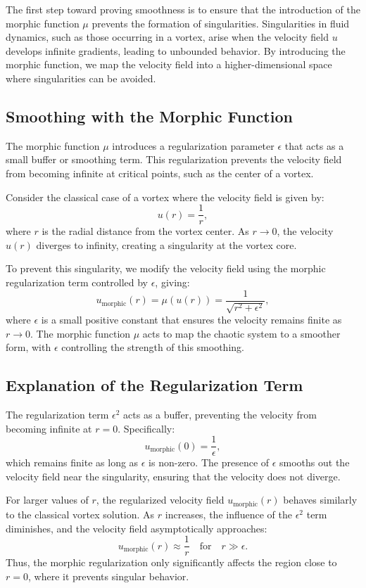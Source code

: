 \documentclass{article}
\begin{document}
The first step toward proving smoothness is to ensure that the introduction of the morphic function \( \mu \) prevents the formation of singularities. Singularities in fluid dynamics, such as those occurring in a vortex, arise when the velocity field \( u \) develops infinite gradients, leading to unbounded behavior. By introducing the morphic function, we map the velocity field into a higher-dimensional space where singularities can be avoided.

\subsection*{Smoothing with the Morphic Function}

The morphic function \( \mu \) introduces a regularization parameter \( \epsilon \) that acts as a small buffer or smoothing term. This regularization prevents the velocity field from becoming infinite at critical points, such as the center of a vortex.

Consider the classical case of a vortex where the velocity field is given by:
\[
u(r) = \frac{1}{r},
\]
where \( r \) is the radial distance from the vortex center. As \( r \to 0 \), the velocity \( u(r) \) diverges to infinity, creating a singularity at the vortex core.

To prevent this singularity, we modify the velocity field using the morphic regularization term controlled by \( \epsilon \), giving:
\[
u_{\text{morphic}}(r) = \mu(u(r)) = \frac{1}{\sqrt{r^2 + \epsilon^2}},
\]
where \( \epsilon \) is a small positive constant that ensures the velocity remains finite as \( r \to 0 \). The morphic function \( \mu \) acts to map the chaotic system to a smoother form, with \( \epsilon \) controlling the strength of this smoothing.

\subsection*{Explanation of the Regularization Term}

The regularization term \( \epsilon^2 \) acts as a buffer, preventing the velocity from becoming infinite at \( r = 0 \). Specifically:
\[
u_{\text{morphic}}(0) = \frac{1}{\epsilon},
\]
which remains finite as long as \( \epsilon \) is non-zero. The presence of \( \epsilon \) smooths out the velocity field near the singularity, ensuring that the velocity does not diverge.

For larger values of \( r \), the regularized velocity field \( u_{\text{morphic}}(r) \) behaves similarly to the classical vortex solution. As \( r \) increases, the influence of the \( \epsilon^2 \) term diminishes, and the velocity field asymptotically approaches:
\[
u_{\text{morphic}}(r) \approx \frac{1}{r} \quad \text{for} \quad r \gg \epsilon.
\]
Thus, the morphic regularization only significantly affects the region close to \( r = 0 \), where it prevents singular behavior.
\end{document}

